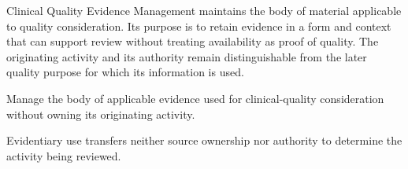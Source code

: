 Clinical Quality Evidence Management maintains the body of material applicable to quality consideration. Its purpose is to retain evidence in a form and context that can support review without treating availability as proof of quality. The originating activity and its authority remain distinguishable from the later quality purpose for which its information is used.



Manage the body of applicable evidence used for clinical-quality consideration without owning its originating activity.



Evidentiary use transfers neither source ownership nor authority to determine the activity being reviewed.


